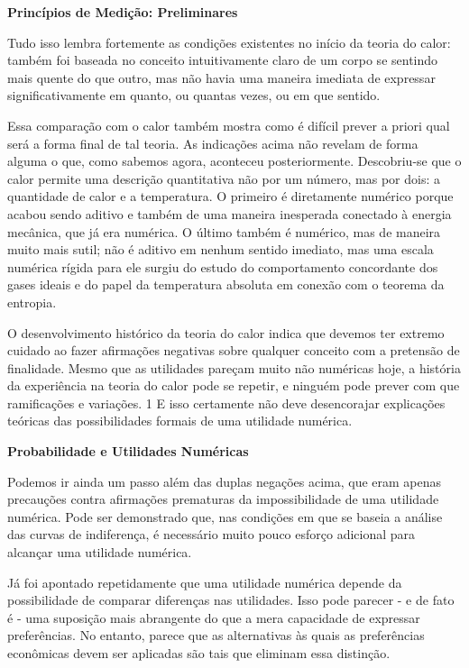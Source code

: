 \documentclass[a4paper,12pt]{article}[abntex2]
\begin{document}
\textbf{Princípios de Medição: Preliminares}

Tudo isso lembra fortemente as condições existentes no início da teoria do calor: também foi baseada no conceito intuitivamente claro de um corpo se sentindo mais quente do que outro, mas não havia uma maneira imediata de expressar significativamente em quanto, ou quantas vezes, ou em que sentido.

Essa comparação com o calor também mostra como é difícil prever a priori qual será a forma final de tal teoria. As indicações acima não revelam de forma alguma o que, como sabemos agora, aconteceu posteriormente. Descobriu-se que o calor permite uma descrição quantitativa não por um número, mas por dois: a quantidade de calor e a temperatura. O primeiro é diretamente numérico porque acabou sendo aditivo e também de uma maneira inesperada conectado à energia mecânica, que já era numérica. O último também é numérico, mas de maneira muito mais sutil; não é aditivo em nenhum sentido imediato, mas uma escala numérica rígida para ele surgiu do estudo do comportamento concordante dos gases ideais e do papel da temperatura absoluta em conexão com o teorema da entropia.

O desenvolvimento histórico da teoria do calor indica que devemos ter extremo cuidado ao fazer afirmações negativas sobre qualquer conceito com a pretensão de finalidade. Mesmo que as utilidades pareçam muito não numéricas hoje, a história da experiência na teoria do calor pode se repetir, e ninguém pode prever com que ramificações e variações. 1 E isso certamente não deve desencorajar explicações teóricas das possibilidades formais de uma utilidade numérica.

\textbf{Probabilidade e Utilidades Numéricas}

Podemos ir ainda um passo além das duplas negações acima, que eram apenas precauções contra afirmações prematuras da impossibilidade de uma utilidade numérica. Pode ser demonstrado que, nas condições em que se baseia a análise das curvas de indiferença, é necessário muito pouco esforço adicional para alcançar uma utilidade numérica.

Já foi apontado repetidamente que uma utilidade numérica depende da possibilidade de comparar diferenças nas utilidades. Isso pode parecer - e de fato é - uma suposição mais abrangente do que a mera capacidade de expressar preferências. No entanto, parece que as alternativas às quais as preferências econômicas devem ser aplicadas são tais que eliminam essa distinção.
\end{document}
